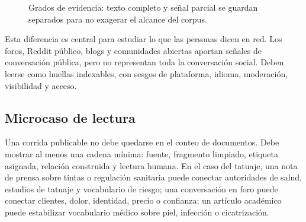 \documentclass[11pt]{article}
\begin{document}
\begin{figure}[H]
\centering
{}
\caption{Grados de evidencia: texto completo y señal parcial se guardan separados para no exagerar el alcance del corpus.}
\label{fig:derechos-evidencia-es}
\end{figure}

Esta diferencia es central para estudiar lo que las personas dicen en red. Los
foros, Reddit público, blogs y comunidades abiertas aportan señales de
conversación pública, pero no representan toda la conversación social. Deben
leerse como huellas indexables, con sesgos de plataforma, idioma, moderación,
visibilidad y acceso.

\subsection*{Microcaso de lectura}

Una corrida publicable no debe quedarse en el conteo de documentos. Debe mostrar
al menos una cadena mínima: fuente, fragmento limpiado, etiqueta asignada,
relación construida y lectura humana. En el caso del tatuaje, una nota de prensa
sobre tintas o regulación sanitaria puede conectar autoridades de salud,
estudios de tatuaje y vocabulario de riesgo; una conversación en foro puede
conectar clientes, dolor, identidad, precio o confianza; un artículo académico
puede estabilizar vocabulario médico sobre piel, infección o cicatrización.
\end{document}
